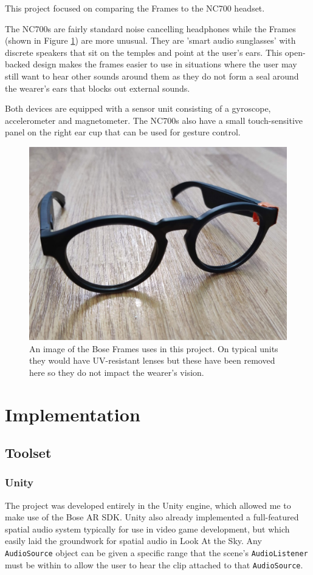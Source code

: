 \documentclass{l4proj}
\begin{document}
This project focused on comparing the Frames to the NC700 headset.

The NC700s are fairly standard noise cancelling headphones while the Frames (shown in Figure \ref{fig:frames}) are more unusual. They are 'smart audio sunglasses' with discrete speakers that sit on the temples and point at the user's ears. This open-backed design makes the frames easier to use in situations where the user may still want to hear other sounds around them as they do not form a seal around the wearer's ears that blocks out external sounds.

Both devices are equipped with a sensor unit consisting of a gyroscope, accelerometer and magnetometer. The NC700s also have a small touch-sensitive panel on the right ear cup that can be used for gesture control.

\begin{figure}[htb!]
    \centering
    \includegraphics[width=0.6\linewidth]{images/frames.jpg}
    \caption{An image of the Bose Frames uses in this project. On typical units they would have UV-resistant lenses but these have been removed here so they do not impact the wearer's vision.}
    \label{fig:frames}
\end{figure}
\chapter{Implementation}
\section{Toolset}

\subsection{Unity}
The project was developed entirely in the Unity engine, which allowed me to make use of the Bose AR SDK. Unity also already implemented a full-featured spatial audio system typically for use in video game development, but which easily laid the groundwork for spatial audio in Look At the Sky.
Any \texttt{AudioSource} object can be given a specific range that the scene's \texttt{AudioListener} must be within to allow the user to hear the clip attached to that \texttt{AudioSource}. 
\end{document}
